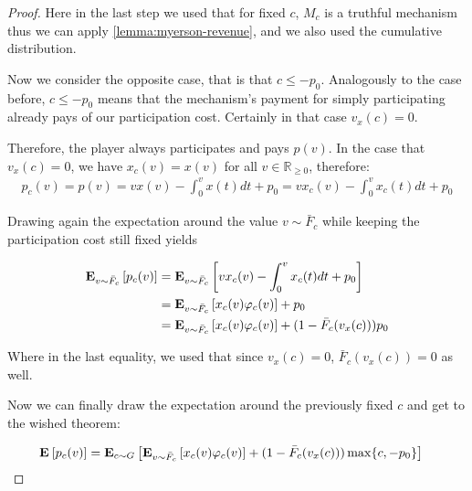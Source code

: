 \documentclass[11pt,a4paper]{article}
\newcommand{\RR}{\ensuremath{\mathbb{R}}}
\newcommand{\Ex}[2][]{\mbox{\rm\bf E}_{#1}\left[#2\right]}
\newcommand{\1}[1]{\mbox{\rm\bf 1}_{#1}}
\begin{document}
\begin{section}{}
\begin{proof}
     Here in the last step we used that for fixed $c$, $M_c$ is a truthful mechanism thus we can apply \autoref{lemma:myerson-revenue}, and we also used the cumulative distribution.

     Now we consider the opposite case, that is that $c \leq -p_0$.
     Analogously to the case before, $c \leq -p_0$ means that the mechanism's payment for simply participating already pays of our participation cost.
     Certainly in that case $v_x(c) = 0$.

     Therefore, the player always participates and pays $p(v)$. In the case that $v_x(c) = 0$, we have $x_c(v) = x(v)$ for all $v \in \RR_{\geq 0}$, therefore:
     \begin{align*}
         p_c(v) = p(v) = v x(v) - \int_0^v x(t)dt + p_0 = v x_c(v) - \int_0^v x_c(t)dt + p_0
     \end{align*}

     Drawing again the expectation around the value $v \sim \bar{F}_c$ while keeping the participation cost still fixed yields


     \begin{align*}
         \Ex[v \sim \bar{F}_c]{p_c(v)} & = \Ex[v \sim \bar{F}_c]{v x_c(v) - \int_0^v x_c(t)dt + p_0}                  \\
                                       & = \Ex[v \sim \bar{F}_c]{x_c(v) \varphi_c(v)} + p_0                           \\
                                       & = \Ex[v \sim \bar{F}_c]{x_c(v) \varphi_c(v)} + (1 - \bar{F}_{c}(v_x(c))) p_0
     \end{align*}

     Where in the last equality, we used that since $v_x(c) = 0$, $\bar{F}_{c}(v_x(c)) = 0$ as well.

     Now we can finally draw the expectation around the previously fixed $c$ and get to the wished theorem:

     \begin{align*}
         \Ex{p_c(v)} & = \Ex[c \sim G]{\Ex[v \sim \bar{F}_c]{x_c(v) \varphi_c(v)} + (1 - \bar{F}_{c}(v_x(c))) \max\{c, -p_0\} }
     \end{align*}
 \end{proof}

\end{section}


\end{document}
